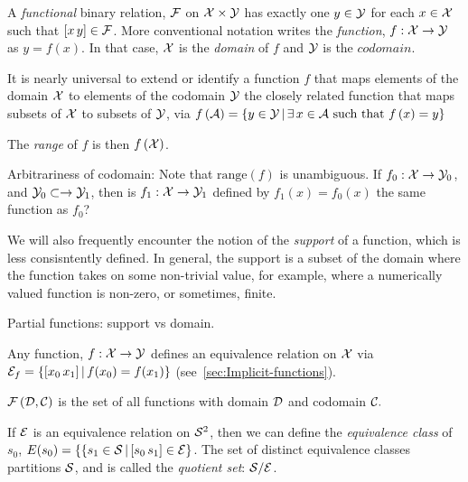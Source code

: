 \label{sec:Functions}

A \textit{functional} binary relation, $\mathcal{F}$ on $\mathcal{X}
\times \mathcal{Y}$ has exactly one $y \in \mathcal{Y}$ for each
$x \in \mathcal{X}$ such that $[x \, y] \in \mathcal{F}$.
More conventional notation writes the \textit{function}, 
$f : \mathcal{X} \rightarrow \mathcal{Y}$ as $y = f(x)$.
In that case, $\mathcal{X}$ is the \textit{domain} of $f$
and $\mathcal{Y}$ is the $codomain$.

It is nearly universal to extend or identify a function $f$ that maps 
elements of the domain $\mathcal{X}$
to elements of 
the codomain $\mathcal{Y}$
the closely related function that maps
subsets of $\mathcal{X}$ to subsets of $\mathcal{Y}$,
via $f\left( \mathcal{A} \right) = 
 \left\{ y \in \mathcal{Y} \, | \, \exists \, x \in \mathcal{A} 
\text{ such that } f\left( x \right) = y \right\} $

The \textit{range} of $f$ is then $f\left( \mathcal{X} \right)$.

Arbitrariness of codomain:
Note that $\text{range}\left( f \right)$ 
is unambiguous.
If  $f_0 : \mathcal{X} \rightarrow \mathcal{Y}_0$,
and $\mathcal{Y}_0 \subset \rightarrow \mathcal{Y}_1$,
then is $f_1 : \mathcal{X} \rightarrow \mathcal{Y}_1$
defined by $f_1(x) = f_0(x)$
the same function as $f_0$?

We will also frequently encounter the notion of the 
\textit{support} of a function, which is less consisntently
defined. In general, the support is a subset of the domain
where the function takes on some non-trivial value, for example,
where a numerically valued function is non-zero, or sometimes,
finite.

Partial functions: support vs domain.

Any function, $f : \mathcal{X} \rightarrow \mathcal{Y}$ defines an
equivalence relation on $\mathcal{X}$ via 
$\mathcal{E}_f =  \left\{ [x_0 \, x_1] \, | \, f(x_0) = f(x_1) \right\} $
(see~\ref{sec:Implicit-functions}).

$\mathcal{F}\left( \mathcal{D}, \mathcal{C} \right)$ is the set of all 
functions with domain $\mathcal{D}$ and codomain $\mathcal{C}.$




If $\mathcal{E}$ is an equivalence relation on $\mathcal{S}^2$, then we
can define the \textit{equivalence class} of $s_0$, $E(s_0) = \{
 \left\{ s_1 \in \mathcal{S} \, | \, [s_0 \, s_1] \in \mathcal{E}  \right\} $.
The set of distinct equivalence classes partitions $\mathcal{S}$,
and is called the \textit{quotient set}: $\mathcal{S} / \mathcal{E}$.

